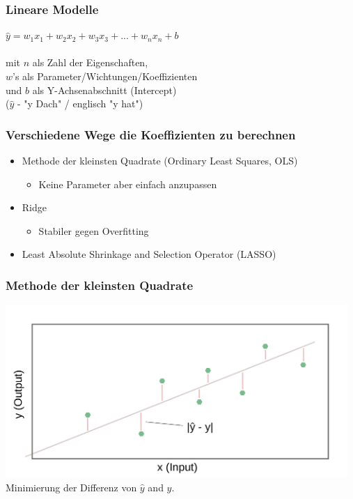 \documentclass[aspectratio=169]{beamer}
\begin{document}
\begin{frame}
  \frametitle{Lineare Modelle}
  \begin{block}{}
    \begin{center}
      $\hat{y} = w_{1}x_{1} + w_{2}x_{2} + w_{3}x_{3} + ... + w_{n}x_{n} + b$\\
      \ \\
      mit $n$ als Zahl der Eigenschaften,\\
      $w$'s als Parameter/Wichtungen/Koeffizienten\\ und
      $b$ als Y-Achsenabschnitt (Intercept)\\
      ($\hat{y}$ - "y Dach" / englisch "y hat")
    \end{center}
  \end{block}  
\end{frame}

\begin{frame}
  \frametitle{Verschiedene Wege die Koeffizienten zu berechnen}
  \begin{block}{}
    \begin{center}
      \begin{itemize}
      \item Methode der kleinsten Quadrate (Ordinary Least Squares, OLS)
        \begin{itemize}
        \item Keine Parameter aber einfach anzupassen
        \end{itemize}
      \item Ridge
        \begin{itemize}
        \item Stabiler gegen Overfitting
        \end{itemize}    
      \item Least Absolute Shrinkage and Selection Operator (LASSO)
      \end{itemize}
    \end{center}
  \end{block}
\end{frame}

\begin{frame}
  \frametitle{Methode der kleinsten Quadrate}
  \begin{center}
    \includegraphics[width=13.0cm]{images/linear_model_ordinary_least_squares.pdf}
    Minimierung der Differenz von $\hat{y}$ and $y$.
  \end{center}
\end{frame}
\end{document}
